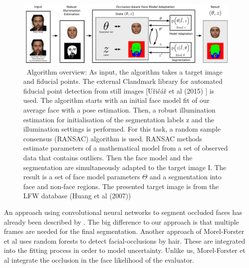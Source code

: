 \begin{figure}[H]
	\centering
	\includegraphics[width=1\linewidth]{Figures/chap1/EGGER's_method.png}
	\caption[Caption for LOF]{\footnotemark \  Algorithm overview: As input, the algorithm takes a target image and fiducial points. The external Clandmark library for automated fiducial point detection from still images [U\v ri\v c\' a\v r et al (2015) \cite{Uricar}] is used. The algorithm starts with an initial face model fit of our average face with a pose estimation. Then, a robust illumination estimation for initialisation of the segmentation labels z and the illumination settings is performed. For this task, a random sample consensus (RANSAC) algorithm is used. RANSAC methods estimate parameters of a mathematical model from a set of observed data that contains outliers. Then the face model and the segmentation are simultaneously adapted to the target image I. The result is a set of face model parameters $\Theta$ and a segmentation into face and non-face regions. The presented target image is from the LFW database (Huang et al (2007))}
	\label{fig:EGGER's_method}
\end{figure}



An approach using convolutional neural networks to segment occluded faces has already been described by \cite{SaitoEtAl}. The big difference to our approach is that multiple frames are needed for the final segmentation. Another approach of Morel-Forster et al \cite{MorelForster} uses random forests to detect facial-occlusions by hair. These are integrated into the fitting process in order to model uncertainty. Unlike us, Morel-Forster et al integrate the occlusion in the face likelihood of the evaluator.
